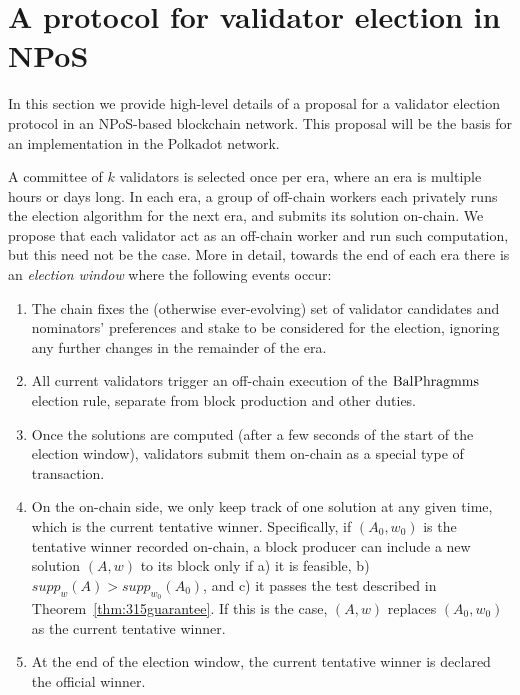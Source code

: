 
\section{A protocol for validator election in NPoS}\label{s:objectives}

In this section we provide high-level details of a proposal for a validator election protocol in an NPoS-based blockchain network. This proposal will be the basis for an implementation in the Polkadot network.

A committee of $k$ validators is selected once per era, where an era is multiple hours or days long. 
In each era, a group of off-chain workers each privately runs the election algorithm for the next era, and submits its solution on-chain. 
We propose that each validator act as an off-chain worker and run such computation, but this need not be the case. 
More in detail, towards the end of each era there is an \emph{election window} where the following events occur:
\begin{enumerate}
\item The chain fixes the (otherwise ever-evolving) set of validator candidates and nominators' preferences and stake to be considered for the election, ignoring any further changes in the remainder of the era. 
\item All current validators trigger an off-chain execution of the $\operatorname{BalPhragmms}$ election rule, separate from block production and other duties.
\item Once the solutions are computed (after a few seconds of the start of the election window), validators submit them on-chain as a special type of transaction. 
\item On the on-chain side, we only keep track of one solution at any given time, which is the current tentative winner. Specifically, if $(A_0,w_0)$ is the tentative winner recorded on-chain, a block producer can include a new solution $(A,w)$ to its block only if a) it is feasible, b) $supp_w(A)>supp_{w_0}(A_0)$, and c) it passes the test described in Theorem~\ref{thm:315guarantee}. If this is the case, $(A,w)$ replaces $(A_0, w_0)$ as the current tentative winner. 
\item At the end of the election window, the current tentative winner is declared the official winner. 
\end{enumerate}

